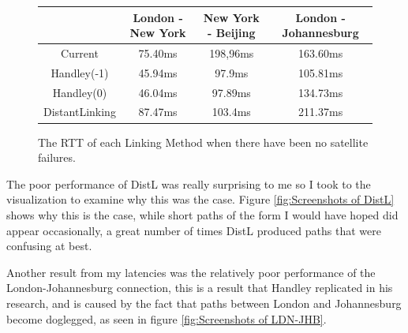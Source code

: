 \documentclass[12pt,a4paper,twoside,openright]{report}
\begin{document}
\begin{figure}
\begin{center}
\caption{The RTT of each Linking Method when there have been no satellite failures.}
\label{fig:Latencies}
\begin{tabular}{ | c | c  | c  | c |}
	\hline
	& London - New York & New York - Beijing & London - Johannesburg \\
	\hline
	Current\cite{Pings} & 75.40ms & 198,96ms\footnotemark & 163.60ms\\
	Handley(-1) & 45.94ms & 97.9ms & 105.81ms\\
	Handley(0) & 46.04ms & 97.89ms & 134.73ms\\
	DistantLinking  & 87.47ms & 103.4ms & 211.37ms\\
	\hline
\end{tabular}
\end{center}
\end{figure}

The poor performance of DistL was really surprising to me so I took to the visualization to examine why this was the case. Figure \ref{fig:Screenshots of DistL} shows why this is the case, while short paths of the form I would have hoped did appear occasionally, a great number of times DistL produced paths that were confusing at best.

Another result from my latencies was the relatively poor performance of the London-Johannesburg connection, this is a result that Handley replicated in his research, and is caused by the fact that paths between London and Johannesburg become doglegged, as seen in figure \ref{fig:Screenshots of LDN-JHB}.

\end{document}

